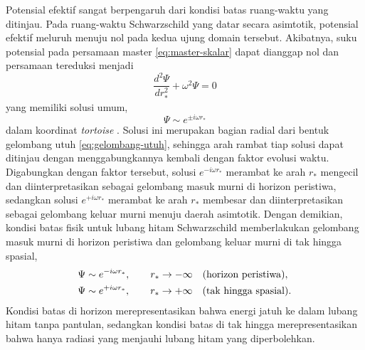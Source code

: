 Potensial efektif sangat berpengaruh dari kondisi batas ruang-waktu yang ditinjau. Pada ruang-waktu
Schwarzschild yang datar secara asimtotik, potensial efektif meluruh menuju nol pada kedua
ujung domain tersebut. Akibatnya, suku potensial pada persamaan master
\eqref{eq:master-skalar} dapat dianggap nol dan persamaan tereduksi menjadi
\begin{equation}
    \frac{d^2\Psi}{dr_*^2} + \omega^2\Psi = 0
\end{equation}
yang memiliki solusi umum,
\begin{equation}
    \Psi \sim e^{\pm i\omega r_*}
\end{equation}
dalam koordinat \textit{tortoise} \parencite{Konoplya2011, Horowitz2000}. Solusi ini
merupakan bagian radial dari bentuk gelombang utuh \eqref{eq:gelombang-utuh}, sehingga arah
rambat tiap solusi dapat ditinjau dengan menggabungkannya kembali dengan faktor evolusi
waktu. Digabungkan dengan faktor tersebut, solusi $e^{-i\omega r_*}$ merambat ke arah $r_*$
mengecil dan diinterpretasikan sebagai gelombang masuk murni di horizon peristiwa, sedangkan
solusi $e^{+i\omega r_*}$ merambat ke arah $r_*$ membesar dan diinterpretasikan sebagai
gelombang keluar murni menuju daerah asimtotik. Dengan demikian, kondisi batas fisik untuk
lubang hitam Schwarzschild memberlakukan gelombang masuk murni di horizon peristiwa dan
gelombang keluar murni di tak hingga spasial,
\begin{align}
    \Psi &\sim e^{-i\omega r_*}, \qquad r_* \to -\infty \quad (\text{horizon peristiwa}), \notag \\
    \Psi &\sim e^{+i\omega r_*}, \qquad r_* \to +\infty \quad (\text{tak hingga spasial}).
    \label{eq:bc-schwarzschild}
\end{align}
Kondisi batas di horizon merepresentasikan bahwa energi jatuh ke dalam lubang hitam tanpa
pantulan, sedangkan kondisi batas di tak hingga merepresentasikan bahwa hanya radiasi yang
menjauhi lubang hitam yang diperbolehkan.

